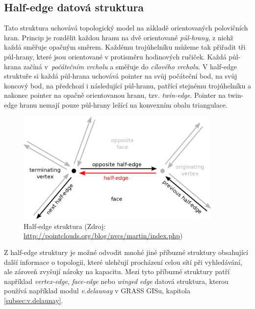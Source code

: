 \documentclass[12pt,a4paper]{article}
\begin{document}
{\newpage
\subsection{Half-edge datová struktura}
\label{subsec:HE_struct}

Tato struktura uchovává topologický model na základě orientovaných
polovičních hran. Princip je rozdělit každou hranu na dvě orientované
\emph{půl-hrany}, z nichž každá směřuje opačným směrem. Každému
trojúhelníku můžeme tak přiřadit tři půl-hrany, které jsou orientované
v protisměru hodinových ručiček. Každá půl-hrana začíná
v~\emph{počátečním vrcholu} a směřuje do \emph{cílového vrcholu}. V
half-edge struktuře si každá půl-hrana uchovává pointer na svůj
počáteční bod, na svůj koncový bod, na předchozí i následující
půl-hranu, patřící stejnému trojúhelníku a nakonec pointer na opačně
orientovanou hranu, tzv. \emph{twin-edge}. Pointer na twin-edge hranu
nemají pouze půl-hrany ležící na konvexním obalu triangulace.

\begin{figure}[h!]
\centering
\includegraphics[width=0.9\textwidth]{img/half_edge.png}
\caption{Half-edge struktura (Zdroj: \url{http://pointclouds.org/blog/nvcs/martin/index.php})}
\label{fig:half_edge}
\end{figure}

Z half-edge struktury je možné odvodit mnohé jiné příbuzné struktury
obsahující další informace o topologii, které ulehčují procházení
celou sítí při vyhledávání, ale zároveň zvyšují nároky na
kapacitu. Mezi tyto příbuzné struktury patří například
\emph{vertex-edge}, \emph{face-edge} nebo \emph{winged edge} datová
struktura, kterou používá například modul \emph{v.delaunay} v GRASS
GISu, kapitola \ref{subsec:v.delaunay}.

}
\end{document}
